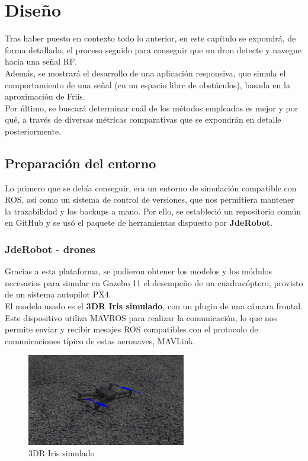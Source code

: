 \chapter{Diseño}
\label{cap:capitulo4}

Tras haber puesto en contexto todo lo anterior, en este capítulo se expondrá, de forma detallada, el proceso seguido para conseguir que un dron detecte y navegue hacia una señal \ac{RF}.\\

Además, se mostrará el desarrollo de una aplicación responsiva, que simula el comportamiento de una señal (en un espacio libre de obstáculos), basada en la aproximación de Friis.\\

Por último, se buscará determinar cuál de los métodos empleados es mejor y por qué, a través de diversas métricas comparativas que se expondrán en detalle posteriormente.\\

\section{Preparación del entorno}
\label{sec:preparacion_del_entorno}

Lo primero que se debía conseguir, era un entorno de simulación compatible con \ac{ROS}, así como un sistema de control de versiones, que nos permitiera mantener la trazabilidad y los backups a mano. Por ello, se estableció un repositorio común en GitHub y se usó el paquete de herramientas dispuesto por \textbf{JdeRobot}.

\subsection{JdeRobot - drones}
\label{subsec:jderobot_drones}

Gracias a esta plataforma, se pudieron obtener los modelos y los módulos necesarios para simular en Gazebo 11 el desempeño de un cuadracóptero, provisto de un sistema autopilot PX4.\\
\newpage
El modelo usado es el \textbf{3DR Iris simulado}, con un plugin de una cámara frontal. Este dispositivo utiliza MAVROS para realizar la comunicación, lo que nos permite enviar y recibir mesajes ROS compatibles con el protocolo de comunicaciones típico de estas aeronaves, MAVLink.\\

\begin{figure} [H]
	\begin{center}
	\includegraphics[height=4cm]{imagenes/cap4/1_px4_drone_gz.png}
	\end{center}
	\caption[3DR Iris simulado]{3DR Iris simulado}
	\label{fig:3dr_iris}
\end{figure}

